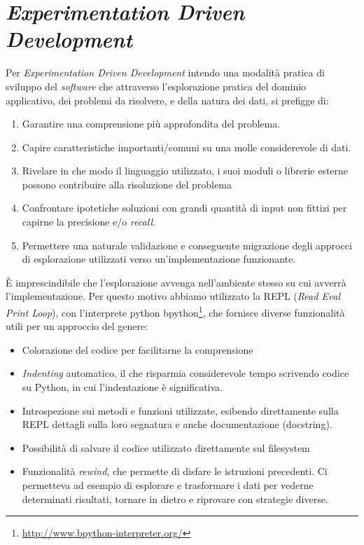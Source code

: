 \documentclass[12pt]{report}
\begin{document}
\section{\textit{Experimentation Driven Development}}

Per \textit{Experimentation Driven Development} intendo una modalità pratica di sviluppo del \textit{software} che attraverso l'esplorazione pratica del dominio applicativo, dei problemi da risolvere, e della natura dei dati, si prefigge di:

\begin{enumerate}
	\item Garantire una comprensione più approfondita del problema.
	\item Capire caratteristiche importanti/comuni su una molle considerevole di dati.
  \item Rivelare in che modo il linguaggio utilizzato, i suoi moduli o librerie esterne possono contribuire alla risoluzione del problema
  \item Confrontare ipotetiche soluzioni con grandi quantità di input non fittizi per capirne la precisione e/o \textit{recall}.
	\item Permettere una naturale validazione e conseguente migrazione degli approcci di esplorazione utilizzati verso un'implementazione funzionante.
\end{enumerate}

È imprescindibile che l'esplorazione avvenga nell'ambiente stesso su cui avverrà l'implementazione. Per questo motivo abbiamo utilizzato la REPL (\textit{Read Eval Print Loop}), con l'interprete python bpython\footnote{\url{http://www.bpython-interpreter.org/}}, che fornisce diverse funzionalità utili per un approccio del genere:

\begin{itemize}
  \item Colorazione del codice per facilitarne la comprensione
  \item \textit{Indenting} automatico, il che risparmia considerevole tempo scrivendo codice su Python, in cui l'indentazione è significativa.
  \item Introspezione sui metodi e funzioni utilizzate, esibendo direttamente sulla REPL dettagli sulla loro segnatura e anche documentazione (docstring).
  \item Possibilità di salvare il codice utilizzato direttamente sul filesystem
  \item Funzionalità \textit{rewind}, che permette di disfare le istruzioni precedenti. Ci permetteva ad esempio di esplorare e trasformare i dati per vederne determinati risultati, tornare in dietro e riprovare con strategie diverse.
\end{itemize}
\end{document}
